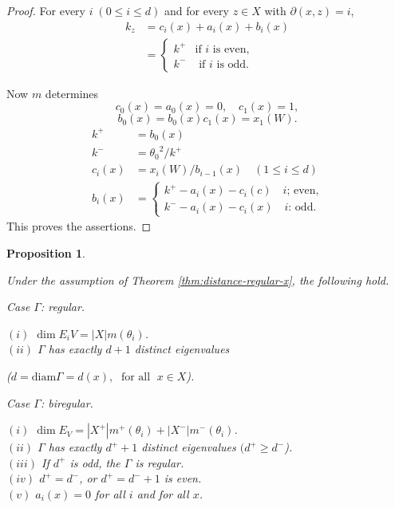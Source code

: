 \documentclass[
]{book}
\newtheorem{proposition}{Proposition}[chapter]
\theoremstyle{definition}
\theoremstyle{definition}
\theoremstyle{definition}
\theoremstyle{definition}
\theoremstyle{remark}
\begin{document}
\begin{proof}
For every \(i \; (0\leq i\leq d)\) and for every \(z\in X\) with \(\partial(x,z) = i\),
\begin{align}
k_z & = c_i(x) + a_i(x) + b_i(x)\\
& = \begin{cases} k^+ & \text{if $i$ is even,}\\
k^- & \text{ if $i$ is odd.}
\end{cases}
\end{align}

Now \(m\) determines
\[c_0(x) = a_0(x) = 0,\quad c_1(x) = 1,\]
\[b_0(x) = b_0(x)c_1(x) = x_1(W).\]
\begin{align}
k^+ & = b_0(x)\\
k^- & = {\theta_0}^2/k^+\\
c_i(x) & = x_i(W)/b_{i-1}(x) \quad (1\leq i\leq d)\\
b_i(x) & = \begin{cases} k^+ - a_i(x) - c_i(c) \quad \text{$i$; even,}\\
k^--a_i(x)-c_i(x) \quad \text{$i$: odd}.
\end{cases}
\end{align}
This proves the assertions.
\end{proof}

\begin{proposition}
\protect\hypertarget{prp:dim-diameter}{}\label{prp:dim-diameter}

Under the assumption of Theorem \ref{thm:distance-regular-x}, the following hold.

Case \(\Gamma\): regular.

\((i)\) \(\dim E_iV = |X|m(\theta_i)\).\\
\((ii)\) \(\Gamma\) has exactly \(d+1\) distinct eigenvalues

(\(d = \mathrm{diam}\Gamma = d(x), \; \text{ for all }\; x\in X\)).

Case \(\Gamma\): biregular.

\((i)\) \(\dim E_V = |X^+| m^+(\theta_i) + |X^-|m^-(\theta_i)\).\\
\((ii)\) \(\Gamma\) has exactly \(d^++1\) distinct eigenvalues \((d^+\geq d^-\)).\\
\((iii)\) If \(d^+\) is odd, the \(\Gamma\) is regular.\\
\((iv)\) \(d^+ = d^-\), or \(d^+ = d^-+1\) is even.\\
\((v)\) \(a_i(x) = 0\) for all \(i\) and for all \(x\).

\end{proposition}
\end{document}
